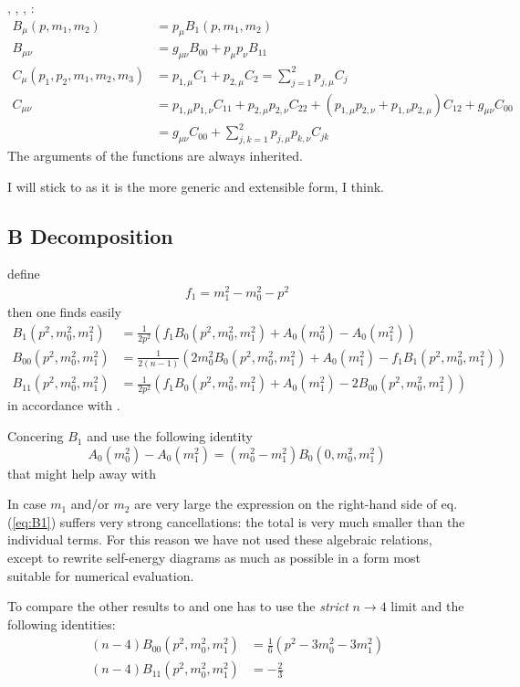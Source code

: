 \HEPMath, \FeynCalc, \LoopTools, \cite{Ellis:2011cr}:
\begin{align}
B_\mu(p,m_1,m_2) &=p_{\mu} B_1(p,m_1,m_2)\\
B_{\mu\nu} &= g_{\mu\nu}B_{00}+p_{\mu}p_{\nu} B_{11}\\
C_{\mu}(p_1,p_2,m_1,m_2,m_3) &= p_{1,\mu}C_{1}+p_{2,\mu}C_{2}=\sum_{j=1}^2 p_{j,\mu}C_{j}\\
C_{\mu\nu} &= p_{1,\mu}p_{1,\nu}C_{11}+p_{2,\mu}p_{2,\nu}C_{22}+(p_{1,\mu}p_{2,\nu}+p_{1,\nu}p_{2,\mu})C_{12}+g_{\mu\nu}C_{00}\\
 &=g_{\mu\nu}C_{00} + \sum_{j,k=1}^2 p_{j,\mu}p_{k,\nu}C_{jk}
\end{align}
The arguments of the functions are always inherited.

I will stick to \HEPMath{} as it is the more generic and extensible form, I think.

\subsection{B Decomposition}
define
\begin{align}
f_1 = m_1^2-m_0^2-p^2
\end{align}
then one finds easily
\begin{align}
B_1(p^2,m_0^2,m_1^2) &= \frac 1 {2p^2}\left(f_1B_0(p^2,m_0^2,m_1^2)+A_0(m_0^2)-A_0(m_1^2)\right) \label{eq:B1}\\
B_{00}(p^2,m_0^2,m_1^2) &= \frac 1 {2(n-1)}\left(2m_0^2B_0(p^2,m_0^2,m_1^2)+A_0(m_1^2)-f_1B_1(p^2,m_0^2,m_1^2)\right)\\
B_{11}(p^2,m_0^2,m_1^2) &= \frac 1 {2p^2}\left(f_1B_0(p^2,m_0^2,m_1^2)+A_0(m_1^2)-2B_{00}(p^2,m_0^2,m_1^2)\right)
\end{align}
in accordance with \cite{Bojak:2000eu,Ellis:2011cr}.

Concering $B_1$ \cite{Passarino:1978jh} and \LoopTools{} use the following identity
\begin{equation}
A_0(m_0^2)-A_0(m_1^2)=(m_0^2-m_1^2)B_0(0,m_0^2,m_1^2)
\end{equation}
that might help away with
\begin{displayquote}
In case $m_1$ and/or $m_2$ are very large the expression on the right-hand side of eq. (\ref{eq:B1}) suffers very strong cancellations: the total is very much smaller than the individual terms. For this reason we have not used these algebraic relations, except to rewrite self-energy diagrams as much as possible in a form most suitable for numerical evaluation.
\end{displayquote}

To compare the other results to \cite{Passarino:1978jh} and \LoopTools{} one has to use the \textit{strict} $n\rightarrow 4$ limit and the following identities\cite{Denner:2005nn}:
\begin{align}
(n-4) B_{00}(p^2,m_0^2,m_1^2) &= \frac 1 6 (p^2-3m_0^2-3m_1^2)\\
(n-4) B_{11}(p^2,m_0^2,m_1^2) &= -\frac 2 3
\end{align}
